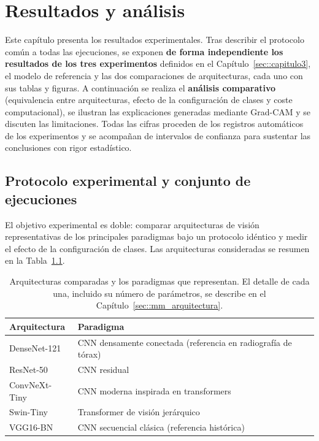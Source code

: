 %
\chapter{Resultados y análisis}
\label{sec::capitulo4}

Este capítulo presenta los resultados experimentales. Tras describir el protocolo
común a todas las ejecuciones, se exponen \textbf{de forma independiente los resultados
de los tres experimentos} definidos en el Capítulo~\ref{sec::capitulo3}, el modelo de
referencia y las dos comparaciones de arquitecturas, cada uno con sus tablas y figuras.
A continuación se realiza el \textbf{análisis comparativo} (equivalencia entre
arquitecturas, efecto de la configuración de clases y coste computacional), se ilustran
las explicaciones generadas mediante Grad-CAM y se discuten las limitaciones. Todas las
cifras proceden de los registros automáticos de los experimentos y se acompañan de
intervalos de confianza para sustentar las conclusiones con rigor estadístico.


\section{Protocolo experimental y conjunto de ejecuciones}
\label{sec::res_protocolo}

El objetivo experimental es doble: comparar arquitecturas de visión representativas de
los principales paradigmas bajo un protocolo idéntico y medir el efecto de la
configuración de clases. Las arquitecturas consideradas se resumen en la
Tabla~\ref{tab::res_arqs}.

\begin{table}[h]
\centering
\begin{tabularx}{\textwidth}{l X}
\toprule
\textbf{Arquitectura} & \textbf{Paradigma} \\
\midrule
DenseNet-121 & CNN densamente conectada (referencia en radiografía de tórax) \\
ResNet-50 & CNN residual \\
ConvNeXt-Tiny & CNN moderna inspirada en transformers \\
Swin-Tiny & Transformer de visión jerárquico \\
VGG16-BN & CNN secuencial clásica (referencia histórica) \\
\bottomrule
\end{tabularx}
\caption{Arquitecturas comparadas y los paradigmas que representan. El detalle de cada
una, incluido su número de parámetros, se describe en el
Capítulo~\ref{sec::mm_arquitectura}.}
\label{tab::res_arqs}
\end{table}

